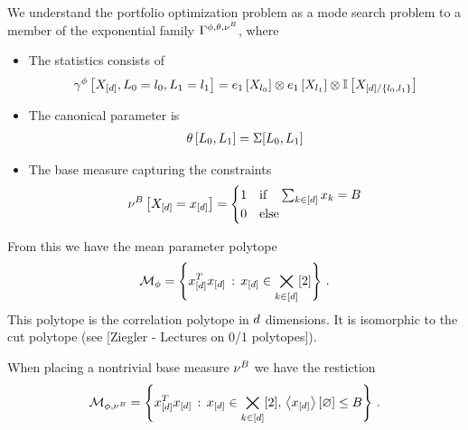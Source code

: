 \documentclass[aps,onecolumn,nofootinbib,pra]{article}
\begin{document}
    We understand the portfolio optimization problem as a mode search problem to a member of the exponential family $\Gamma^{\phi,\theta,\nu^{B}}$, where
    \begin{itemize}
        \item The statistics consists of
        \begin{align*}
            \gamma^{\phi}\left[X_{[d]},L_{0}=l_{0},L_{1}=l_{1}\right]
            = e_1\left[X_{l_{0}}\right] \otimes e_1\left[X_{l_{1}}\right] \otimes \mathbb{I}\left[X_{[d]/\{l_{0},l_{1}\}}\right]
        \end{align*}
        \item The canonical parameter is
        \begin{align*}
            \theta\left[L_{0},L_{1}\right]
            = \Sigma[L_{0},L_{1}]
        \end{align*}
        \item The base measure capturing the constraints
        \begin{align*}
        \nu^{B}\left[X_{[d]}=x_{[d]}\right]
        =\begin{cases}
             1 & \text{if} \quad \sum_{k\in[d]}x_{k} = B \\
             0 & \text{else}
        \end{cases}
    \end{align*}
    \end{itemize}

    From this we have the mean parameter polytope
    \begin{align*}
        \mathcal{M}_{\phi} = \left\{ x_{[d]}^Tx_{[d]} \, : \, x_{[d]}\in\bigtimes_{k\in[d]}[2]\right\} \, .
    \end{align*}
    This polytope is the correlation polytope in $d$ dimensions.
    It is isomorphic to the cut polytope (see [Ziegler - Lectures on 0/1 polytopes]).

    When placing a nontrivial base measure $\nu^{B}$ we have the restiction
    \begin{align*}
        \mathcal{M}_{\phi,\nu^{B}} = \left\{ x_{[d]}^Tx_{[d]} \, : \, x_{[d]}\in\bigtimes_{k\in[d]}[2], \, \left\langle x_{[d]}\right\rangle \left[ \varnothing \right] \leq B\right\} \, .
    \end{align*}
\end{document}
